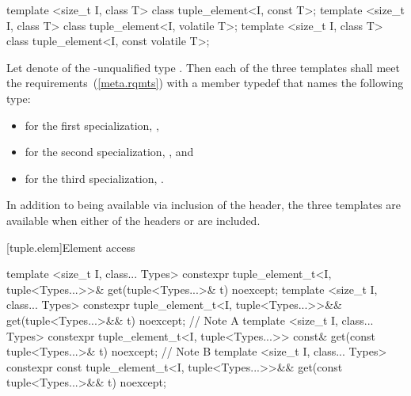 \begin{itemdecl}
template <size_t I, class T> class tuple_element<I, const T>;
template <size_t I, class T> class tuple_element<I, volatile T>;
template <size_t I, class T> class tuple_element<I, const volatile T>;
\end{itemdecl}

\begin{itemdescr}
\pnum
Let  denote  of the \cv-unqualified type . Then
each of the three templates shall meet the 
requirements~(\ref{meta.rqmts}) with a member typedef  that names the following
type:

\begin{itemize}
\item
for the first specialization, ,
\item
for the second specialization, , and
\item
for the third specialization, .
\end{itemize}

\pnum
In addition to being available via inclusion of the  header,
the three templates are available when either of the headers  or
 are included.
\end{itemdescr}

[tuple.elem]{Element access}

%
%
\begin{itemdecl}
template <size_t I, class... Types>
  constexpr tuple_element_t<I, tuple<Types...>>& get(tuple<Types...>& t) noexcept;
template <size_t I, class... Types>
  constexpr tuple_element_t<I, tuple<Types...>>&& get(tuple<Types...>&& t) noexcept; // Note A
template <size_t I, class... Types>
  constexpr tuple_element_t<I, tuple<Types...>> const& get(const tuple<Types...>& t) noexcept; // Note B
template <size_t I, class... Types>
  constexpr const tuple_element_t<I, tuple<Types...>>&& get(const tuple<Types...>&& t) noexcept; 
\end{itemdecl}


